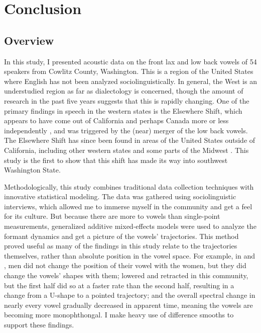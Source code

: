 \chapter{Conclusion}
\label{ch:conclusion}


\section{Overview}

In this study, I presented acoustic data on the front lax and low back vowels of 54 speakers from Cowlitz County, Washington. This is a region of the United States where English has not been analyzed sociolinguistically. In general, the West is an understudied region as far as dialectology is concerned, though the amount of research in the past five years suggests that this is rapidly changing. One of the primary findings in speech in the western states is the Elsewhere Shift, which appears to have come out of California and perhaps Canada more or less independently \citep{hinton_etal_1987, clarke_etal_1995}, and was triggered by the (near) merger of the low back vowels. The Elsewhere Shift has since been found in areas of the United States outside of California, including other western states and some parts of the Midwest \citep{fridland_etal_2016_pads, fridland_etal_2017_pads, strelluf_2019}. This study is the first to show that this shift has made its way into southwest Washington State.

Methodologically, this study combines traditional data collection techniques with innovative statistical modeling. The data was gathered using sociolinguistic interviews, which allowed me to immerse myself in the community and get a feel for its culture. But because there are more to vowels than single-point measurements, generalized additive mixed-effects models were used to analyze the formant dynamics and get a picture of the vowels' trajectories. This method proved useful as many of the findings in this study relate to the trajectories themselves, rather than absolute position in the vowel space. For example, in \bet and \ben, men did not change the position of their vowel with the women, but they did change the vowels' shapes with them; \bat lowered and retracted in this community, but the first half did so at a faster rate than the second half, resulting in a change from a U-shape to a pointed trajectory; and the overall spectral change in nearly every vowel gradually decreased in apparent time, meaning the vowels are becoming more monophthongal. I make heavy use of difference smooths to support these findings.

